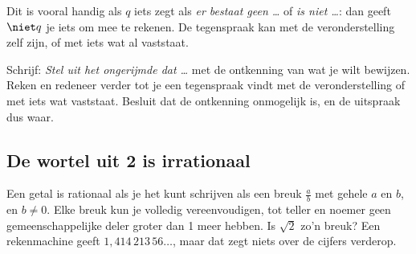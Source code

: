 Dit is vooral handig als $q$ iets zegt als \textit{er bestaat geen \ldots} of \textit{is niet \ldots}: dan geeft $\niet q$ je iets om mee te rekenen. De tegenspraak kan met de veronderstelling zelf zijn, of met iets wat al vaststaat.


\begin{werkwijze}
Schrijf: \textit{Stel uit het ongerijmde dat \ldots} met de ontkenning van wat je wilt bewijzen. Reken en redeneer verder tot je een tegenspraak vindt met de veronderstelling of met iets wat vaststaat. Besluit dat de ontkenning onmogelijk is, en de uitspraak dus waar.
\end{werkwijze}

\begin{oefeningen}

\end{oefeningen}

\subsection{De wortel uit 2 is irrationaal}

Een getal is rationaal als je het kunt schrijven als een breuk $\frac{a}{b}$ met gehele $a$ en $b$, en $b \neq 0$. Elke breuk kun je volledig vereenvoudigen, tot teller en noemer geen gemeenschappelijke deler groter dan 1 meer hebben. Is $\sqrt2$ zo'n breuk? Een rekenmachine geeft $1{,}414\,213\,56\ldots$, maar dat zegt niets over de cijfers verderop.

